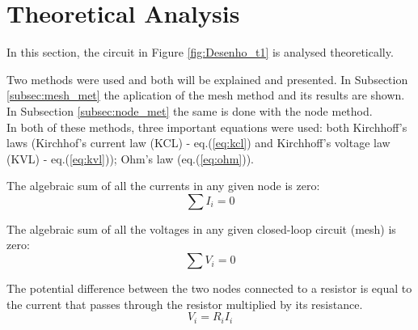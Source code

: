 
\section{Theoretical Analysis}
\label{sec:analysis}



In this section, the circuit in Figure \ref{fig:Desenho_t1} is analysed theoretically.

Two methods were used and both will be explained and presented. In Subsection \ref{subsec:mesh_met}
the aplication of the mesh method and its results are shown. In Subsection \ref{subsec:node_met} the
same is done with the node method. \\

In both of these methods, three important equations were used: both Kirchhoff's laws (Kirchhof's
current law (KCL) - eq.(\ref{eq:kcl}) and Kirchhoff's voltage law (KVL) - eq.(\ref{eq:kvl}));
Ohm's law (eq.(\ref{eq:ohm})).

The algebraic sum of all the currents in any given node is zero:
\begin{equation}
	\sum I_i = 0
	\label{eq:kcl}
\end{equation}

The algebraic sum of all the voltages in any given closed-loop circuit (mesh) is zero:
\begin{equation}
	\sum V_i = 0
	\label{eq:kvl}
\end{equation}

The potential difference between the two nodes connected to a resistor is equal to the current that 
passes through the resistor multiplied by its resistance.
\begin{equation}
	V_i = R_iI_i
	\label{eq:ohm}
\end{equation}




